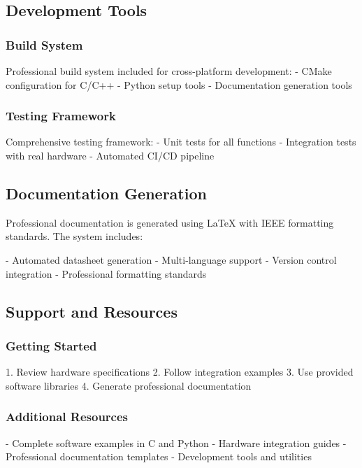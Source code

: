 \documentclass[11pt,a4paper]{article}
\begin{document}
\subsection{Development Tools}

\subsubsection{Build System}

Professional build system included for cross-platform development:
- CMake configuration for C/C++
- Python setup tools
- Documentation generation tools

\subsubsection{Testing Framework}

Comprehensive testing framework:
- Unit tests for all functions
- Integration tests with real hardware
- Automated CI/CD pipeline

\subsection{Documentation Generation}

Professional documentation is generated using LaTeX with IEEE formatting standards. The system includes:

- Automated datasheet generation
- Multi-language support
- Version control integration
- Professional formatting standards

\subsection{Support and Resources}

\subsubsection{Getting Started}

1. Review hardware specifications
2. Follow integration examples
3. Use provided software libraries
4. Generate professional documentation

\subsubsection{Additional Resources}

- Complete software examples in C and Python
- Hardware integration guides
- Professional documentation templates
- Development tools and utilities
\end{document}
